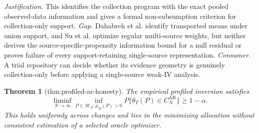 \documentclass{article}
\newtheorem{theorem}{Theorem}
\begin{document}
\par\smallskip\noindent \textit{Justification.} This identifies the collection program with the exact pooled observed-data information and gives a formal non-subsumption criterion for collection-only support. \textit{Gap.} Dahabreh et al. identify transported means under union support, and Su et al. optimize regular multi-source weights, but neither derives the source-specific-propensity information bound for a null residual or proves failure of every support-retaining single-source representation. \textit{Consumer.} A trial repository can decide whether its evidence geometry is genuinely collection-only before applying a single-source weak-IV analysis.

\begin{theorem}[thm:profiled-ar-honesty]\label{thm:profiled-ar-honesty}
The empirical profiled inversion satisfies \[\liminf_{N\to\infty}\inf_{P\in\mathcal M_N:\mu_D(P)>0}P\{\theta_T(P)\in C_N^{\mathrm{AR}}\}\ge1-\alpha.\] This holds uniformly across changes and ties in the minimizing allocation without consistent estimation of a selected oracle optimizer.
\end{theorem}
\end{document}
